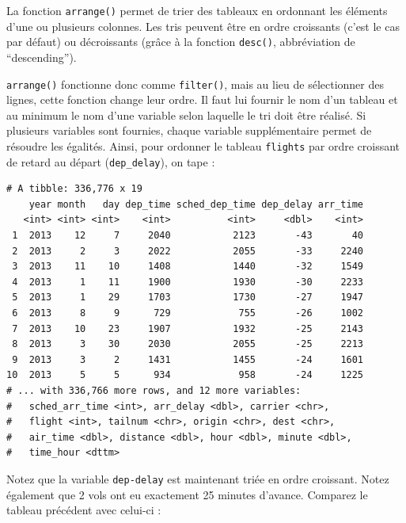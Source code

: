 \documentclass[a4paperpaper,]{article}
\newenvironment{Shaded}{\begin{snugshade}}{\end{snugshade}}
\newcommand{\KeywordTok}[1]{\textcolor[rgb]{0.12,0.11,0.11}{\textbf{#1}}}
\newcommand{\NormalTok}[1]{\textcolor[rgb]{0.12,0.11,0.11}{#1}}
\newcommand{\OperatorTok}[1]{\textcolor[rgb]{0.12,0.11,0.11}{#1}}
\newcommand{\StringTok}[1]{\textcolor[rgb]{0.75,0.01,0.01}{#1}}
\begin{document}
La fonction \texttt{arrange()} permet de trier des tableaux en ordonnant les éléments d'une ou plusieurs colonnes. Les tris peuvent être en ordre croissants (c'est le cas par défaut) ou décroissants (grâce à la fonction \texttt{desc()}, abbréviation de ``descending'').

\texttt{arrange()} fonctionne donc comme \texttt{filter()}, mais au lieu de sélectionner des lignes, cette fonction change leur ordre. Il faut lui fournir le nom d'un tableau et au minimum le nom d'une variable selon laquelle le tri doit être réalisé. Si plusieurs variables sont fournies, chaque variable supplémentaire permet de résoudre les égalités. Ainsi, pour ordonner le tableau \texttt{flights} par ordre croissant de retard au départ (\texttt{dep\_delay}), on tape :

\begin{Shaded}
\end{Shaded}

\begin{verbatim}
# A tibble: 336,776 x 19
    year month   day dep_time sched_dep_time dep_delay arr_time
   <int> <int> <int>    <int>          <int>     <dbl>    <int>
 1  2013    12     7     2040           2123       -43       40
 2  2013     2     3     2022           2055       -33     2240
 3  2013    11    10     1408           1440       -32     1549
 4  2013     1    11     1900           1930       -30     2233
 5  2013     1    29     1703           1730       -27     1947
 6  2013     8     9      729            755       -26     1002
 7  2013    10    23     1907           1932       -25     2143
 8  2013     3    30     2030           2055       -25     2213
 9  2013     3     2     1431           1455       -24     1601
10  2013     5     5      934            958       -24     1225
# ... with 336,766 more rows, and 12 more variables:
#   sched_arr_time <int>, arr_delay <dbl>, carrier <chr>,
#   flight <int>, tailnum <chr>, origin <chr>, dest <chr>,
#   air_time <dbl>, distance <dbl>, hour <dbl>, minute <dbl>,
#   time_hour <dttm>
\end{verbatim}

Notez que la variable \texttt{dep-delay} est maintenant triée en ordre croissant. Notez également que 2 vols ont eu exactement 25 minutes d'avance. Comparez le tableau précédent avec celui-ci :
\end{document}
